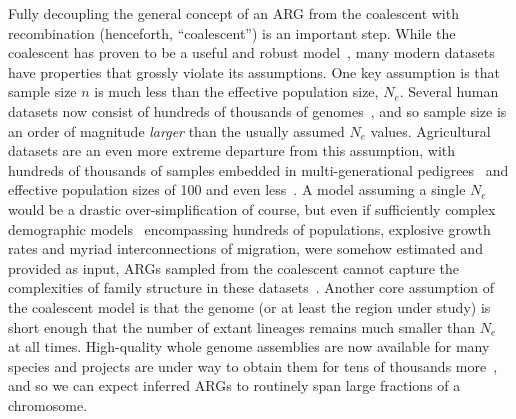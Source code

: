 \documentclass{article}
\begin{document}
Fully decoupling the general concept of an ARG from the coalescent
with recombination (henceforth, ``coalescent'')
is an important step.
While the coalescent has proven to be a useful and
robust
model~\citep{wakeley2012gene,bhaskar2014distortion,nelson2020accounting},
many modern datasets have properties that grossly
violate its assumptions.
One key assumption is that
sample size $n$ is much less than the effective population size, $N_e$.
Several human datasets now consist of hundreds of thousands of
genomes~\citep{turnbull2018hundred, bycroft2018genome,
karczewski2020mutational,tanjo2021practical,
halldorsson2022sequences},
and so sample size is an order of magnitude \emph{larger} than the
usually assumed $N_e$ values.
Agricultural datasets are an even more extreme departure from this
assumption, with hundreds of thousands of samples embedded in
multi-generational pedigrees~\citep{hayes20191000,Ros-Freixedes2020}
and effective population sizes of 100 and even
less~\citep{MacLeod2013,Makanjuola2020,Hall2016,Porcnic2016}.
A model assuming a single $N_e$ would be a
drastic over-simplification of course, but
even if sufficiently complex demographic models~\citep{gower2022demes}
encompassing hundreds of populations, explosive growth rates and myriad
interconnections of migration, were somehow estimated and provided as input,
ARGs sampled from the coalescent cannot capture the complexities
of family structure in these
datasets~\citep[e.g.][]{turnbull2018hundred,Ros-Freixedes2020}.
Another core assumption of the coalescent model is that the genome
(or at least the region under study) is short enough that the number of extant
lineages remains much smaller than $N_e$ at all times.
High-quality whole genome assemblies are now available
for many species %
and projects are under way to obtain
them for tens of thousands more~\citep{darwin2022sequence,lewin2022earth},
and so we can expect inferred ARGs to routinely span
large fractions of a chromosome.
\end{document}
